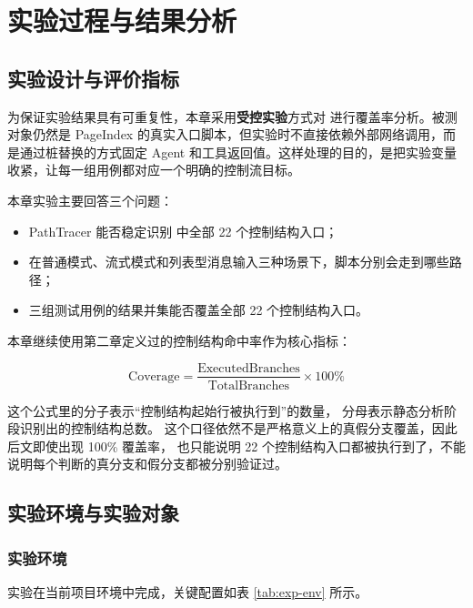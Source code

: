 
\chapter{实验过程与结果分析}
\label{chap:experiment}

\section{实验设计与评价指标}

为保证实验结果具有可重复性，本章采用\textbf{受控实验}方式对  进行覆盖率分析。被测对象仍然是 PageIndex 的真实入口脚本，但实验时不直接依赖外部网络调用，而是通过桩替换的方式固定 Agent 和工具返回值。这样处理的目的，是把实验变量收紧，让每一组用例都对应一个明确的控制流目标。

本章实验主要回答三个问题：

\begin{itemize}
    \item PathTracer 能否稳定识别  中全部 22 个控制结构入口；
    \item 在普通模式、流式模式和列表型消息输入三种场景下，脚本分别会走到哪些路径；
    \item 三组测试用例的结果并集能否覆盖全部 22 个控制结构入口。
\end{itemize}

本章继续使用第二章定义过的控制结构命中率作为核心指标：

\[
\text{Coverage} = \frac{\text{ExecutedBranches}}{\text{TotalBranches}} \times 100\%
\]

这个公式里的分子表示“控制结构起始行被执行到”的数量，%
分母表示静态分析阶段识别出的控制结构总数。%
这个口径依然不是严格意义上的真假分支覆盖，因此后文即使出现 100\% 覆盖率，%
也只能说明 22 个控制结构入口都被执行到了，不能说明每个判断的真分支和假分支都被分别验证过。

\section{实验环境与实验对象}

\subsection{实验环境}

实验在当前项目环境中完成，关键配置如表 \ref{tab:exp-env} 所示。

